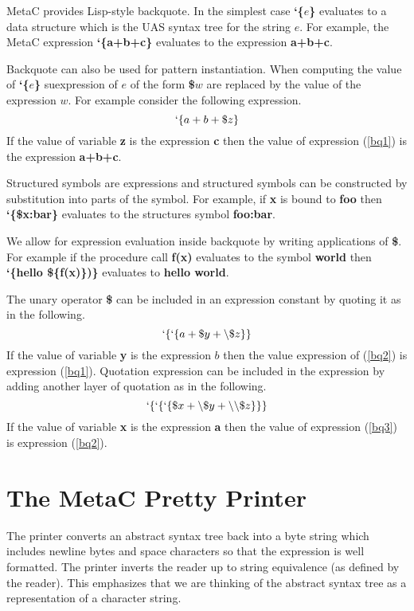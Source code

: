 \documentclass{article}
\begin{document}
MetaC provides Lisp-style backquote.
In the simplest case {\bf `\{$e$\}} evaluates to a data structure which is the UAS syntax tree for
the string $e$.  For example, the MetaC expression {\bf `\{a+b+c\}}
evaluates to the expression {\bf a+b+c}.

Backquote can also be used for pattern instantiation.
When computing the value of {\bf `\{$e$\}} suexpression of $e$ of the form {\bf \$$w$} are replaced by the value of the expression $w$.
For example consider the following expression.
\begin{equation}
\label{bq1}
`\{a+b+\$z\}
\end{equation}
If the value of variable {\bf z} is the expression {\bf c} then the value of expression (\ref{bq1}) is the expression {\bf a+b+c}.

Structured symbols are expressions and structured symbols can be constructed by substitution into parts of the symbol.
For example, if {\bf x} is bound to {\bf foo} then {\bf `\{\$x:bar\}} evaluates to the structures symbol {\bf foo:bar}.

We allow for expression evaluation inside backquote by writing applications of {\bf \$}.  For example if the procedure call {\bf f(x)} evaluates to the symbol {\bf world} then
{\bf `\{hello \$\{f(x)\})\}} evaluates to {\bf hello world}.

The unary operator {\bf \$} can be included in an expression constant by quoting it as in the following.
\begin{equation}
\label{bq2}
`\{`\{a + \$y + \backslash\$z\}\}
\end{equation}
If the value of variable {\bf y} is the expression $b$ then the value expression of (\ref{bq2}) is expression (\ref{bq1}).
Quotation expression can be included in the expression by adding another layer of quotation as in the following.
\begin{equation}
\label{bq3}
`\{`\{`\{\$x + \backslash\$y + \backslash\backslash\$z\}\}\}
\end{equation}
If the value of variable {\bf x} is the expression {\bf a} then the value of expression (\ref{bq3}) is expression (\ref{bq2}).


\section{The MetaC Pretty Printer}

The printer converts an abstract syntax tree back into a byte string which includes newline bytes and space characters
so that the expression is well formatted. The printer inverts the reader up to string equivalence (as defined by the reader).
This emphasizes that we are thinking of the abstract syntax tree as a representation of a character string.
\end{document}
